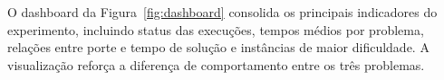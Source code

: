 \documentclass[12pt,a4paper]{article}
\begin{document}
O dashboard da Figura~\ref{fig:dashboard} consolida os principais indicadores
do experimento, incluindo status das execuções, tempos médios por problema,
relações entre porte e tempo de solução e instâncias de maior dificuldade. A
visualização reforça a diferença de comportamento entre os três problemas.




\end{document}
